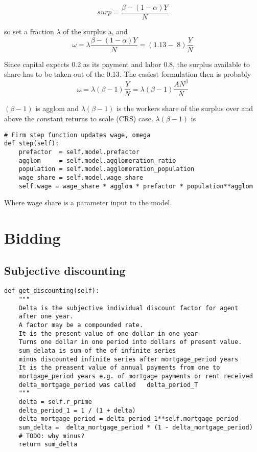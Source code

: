 \[surp= \frac{\beta -(1-\alpha)Y}{N} \] 

 so set a fraction $\lambda$ of the surplus a, and 
 \[\omega= \lambda\frac{\beta -(1-\alpha)Y}{N}= (1.13-.8) \frac{Y}{N} \] 

 Since capital expects 0.2 as its payment and labor 0.8, the surplus available to share has to be taken out of the 0.13. The easiest formulation then is probably 
 \[\omega= \lambda(\beta -1) \frac{Y}{N} =\lambda(\beta -1) \frac{AN^\beta}{N} \] 
 

$(\beta -1)$ is agglom and  $\lambda(\beta -1)$ is the workers share of the surplus over and above the constant returns to scale (CRS) case.   $\lambda(\beta -1)$ is 

\begin{lstlisting}
# Firm step function updates wage, omega
def step(self):
    prefactor  = self.model.prefactor
    agglom     = self.model.agglomeration_ratio
    population = self.model.agglomeration_population
    wage_share = self.model.wage_share  
    self.wage = wage_share * agglom * prefactor * population**agglom
\end{lstlisting}

Where wage share is a parameter input to the model.




\section{Bidding}
\subsection{Subjective discounting}
\begin{lstlisting}
def get_discounting(self):
    """
    Delta is the subjective individual discount factor for agent
    after one year. 
    A factor may be a compounded rate.
    It is the present value of one dollar in one year 
    Turns one dollar in one period into dollars of present value.
    sum_delata is sum of the of infinite series 
    minus discounted infinite series after mortgage_period years
    It is the preasent value of annual payments from one to 
    mortgage_period years e.g. of mortgage payments or rent received
    delta_mortgage_period was called   delta_period_T
    """
    delta = self.r_prime
    delta_period_1 = 1 / (1 + delta) 
    delta_mortgage_period = delta_period_1**self.mortgage_period
    sum_delta =  delta_mortgage_period * (1 - delta_mortgage_period)
    # TODO: why minus?
    return sum_delta
\end{lstlisting}

